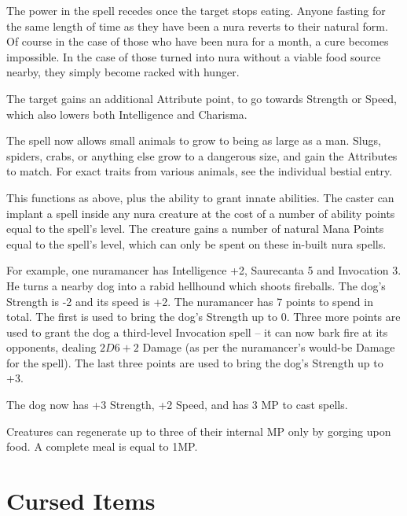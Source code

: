 \begin{multicols}{2}
The power in the spell recedes once the target stops eating.
Anyone fasting for the same length of time as they have been a nura reverts to their natural form.
Of course in the case of those who have been nura for a month, a cure becomes impossible.
In the case of those turned into nura without a viable food source nearby, they simply become racked with hunger.

The target gains an additional Attribute point, to go towards Strength or Speed, which also lowers both Intelligence and Charisma.


The spell now allows small animals to grow to being as large as a man.
Slugs, spiders, crabs, or anything else grow to a dangerous size, and gain the Attributes to match.
For exact traits from various animals, see the individual bestial entry.

\spelllevel
{}

This functions as above, plus the ability to grant innate abilities.  The caster can implant a spell inside any nura creature at the cost of a number of ability points equal to the spell's level.  The creature gains a number of natural Mana Points equal to the spell's level, which can only be spent on these in-built nura spells.

\begin{exampletext}

For example, one nuramancer has Intelligence +2, Saurecanta 5 and Invocation 3.
He turns a nearby dog into a rabid hellhound which shoots fireballs.
The dog's Strength is -2 and its speed is +2.
The nuramancer has 7 points to spend in total.
The first is used to bring the dog's Strength up to 0.
Three more points are used to grant the dog a third-level Invocation spell -- it can now bark fire at its opponents, dealing $2D6+2$ Damage (as per the nuramancer's would-be Damage for the spell).
The last three points are used to bring the dog's Strength up to +3.

The dog now has +3 Strength, +2 Speed, and has 3 MP to cast spells.

\end{exampletext}

Creatures can regenerate up to three of their internal MP only by gorging upon food.  A complete meal is equal to 1MP.

\end{multicols}

\section{Cursed Items}

